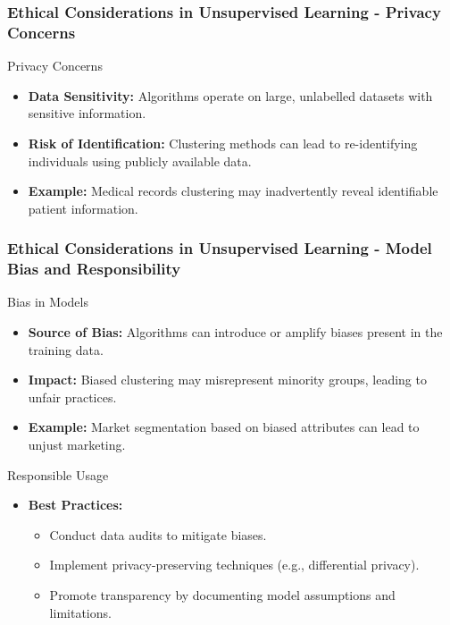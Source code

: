 \documentclass[aspectratio=169]{beamer}
\begin{document}
\begin{frame}[fragile]
    \frametitle{Ethical Considerations in Unsupervised Learning - Privacy Concerns}
    \begin{block}{Privacy Concerns}
        \begin{itemize}
            \item \textbf{Data Sensitivity:} Algorithms operate on large, unlabelled datasets with sensitive information.
            \item \textbf{Risk of Identification:} Clustering methods can lead to re-identifying individuals using publicly available data.
            \item \textbf{Example:} Medical records clustering may inadvertently reveal identifiable patient information.
        \end{itemize}
    \end{block}
\end{frame}

\begin{frame}[fragile]
    \frametitle{Ethical Considerations in Unsupervised Learning - Model Bias and Responsibility}
    \begin{block}{Bias in Models}
        \begin{itemize}
            \item \textbf{Source of Bias:} Algorithms can introduce or amplify biases present in the training data.
            \item \textbf{Impact:} Biased clustering may misrepresent minority groups, leading to unfair practices.
            \item \textbf{Example:} Market segmentation based on biased attributes can lead to unjust marketing.
        \end{itemize}
    \end{block}

    \begin{block}{Responsible Usage}
        \begin{itemize}
            \item \textbf{Best Practices:}
            \begin{itemize}
                \item Conduct data audits to mitigate biases.
                \item Implement privacy-preserving techniques (e.g., differential privacy).
                \item Promote transparency by documenting model assumptions and limitations.
            \end{itemize}
        \end{itemize}
    \end{block}
\end{frame}
\end{document}
